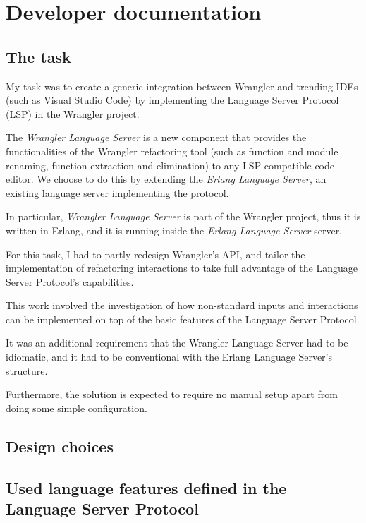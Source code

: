 \chapter{Developer documentation}
\label{ch:impl}

\section{The task}

My task was to create a generic integration between Wrangler and trending IDEs (such as Visual Studio Code) by implementing the Language Server Protocol (LSP) in the Wrangler project.

The \emph{Wrangler Language Server} is a new component that provides the functionalities of the Wrangler refactoring tool (such as function and module renaming, function extraction and elimination) to any LSP-compatible code editor. We choose to do this by extending the \emph{Erlang Language Server}, an existing language server implementing the protocol.

In particular, \emph{Wrangler Language Server} is part of the Wrangler project, thus it is written in Erlang, and it is running inside the \emph{Erlang Language Server} server.

For this task, I had to partly redesign Wrangler’s API, and tailor the implementation of refactoring interactions to take full advantage of the Language Server Protocol’s capabilities. 

This work involved the investigation of how non-standard inputs and interactions can be implemented on top of the basic features of the Language Server Protocol.

It was an additional requirement that the Wrangler Language Server had to be idiomatic, and it had to be conventional with the Erlang Language Server's structure. 

Furthermore, the solution is expected to require no manual setup apart from doing some simple configuration.

\section{Design choices}


\section{Used language features defined in the Language Server Protocol}

